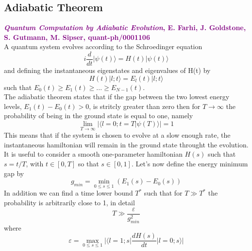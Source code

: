 \documentclass[aps,pra,reprint, onecolumn]{revtex4-2}
\newcommand{\purple}[3]{\textcolor{purple}{\textbf{\textit{#1}, #2, #3}}}
\begin{document}
\subsection{Adiabatic Theorem}
\purple{Quantum Computation by Adiabatic Evolution}{E. Farhi, J. Goldstone, S. Gutmann, M. Sipser}{quant-ph/0001106}\\


A quantum system evolves according to the Schroedinger equation
\begin{equation}
	i\frac{d}{dt}|\psi(t)\rangle = H(t)|\psi(t)\rangle
\end{equation}
and defining the instantaneous eigenstates and eigenvalues of H(t) by
\begin{equation}
	H(t)|l;t\rangle = E_l(t)|l;t\rangle
\end{equation}
such that $E_0(t) \geq E_1(t) \geq ... \geq E_{N-1}(t)$. \\
The adiabatic theorem states that if the gap between the two lowest energy levels, $E_{1}(t) - E_{0}(t) > 0$, is stritcly greater than zero then for $T\rightarrow \infty$ the probability of being in the ground state is equal to one, namely
\begin{equation}
	\lim_{T \to \infty} |\langle l=0;t = T | \psi(T)\rangle| = 1
\end{equation}
This means that if the system is chosen to evolve at a slow enough rate, the instantaneous hamiltonian will remain in the ground state throught the evolution. It is useful to consider a smooth one-parameter hamiltonian $H(s)$ such that $s=t/T$, with $t \in [0,T]$ so that $s \in [0,1]$.
Let's now define the energy minimum gap by
\begin{equation}
	g_{min} = \min_{0 \leq s \leq 1} (E_1(s)-E_0(s))
\end{equation}
In addition we can find a time lower bound $T^*$ such that for $T\gg T^{*}$ the probability is arbitrarily close to 1, in detail
\begin{equation}
	T \gg \frac{\varepsilon}{g^{2}_{min}}
\end{equation}
where
\begin{equation}
	\varepsilon = \max_{0 \leq s \leq 1} \Big| \Big\langle l=1;s\Big| \frac{dH(s)}{dt} \Big| l=0;s\Big\rangle\Big|
\end{equation}
\end{document}
